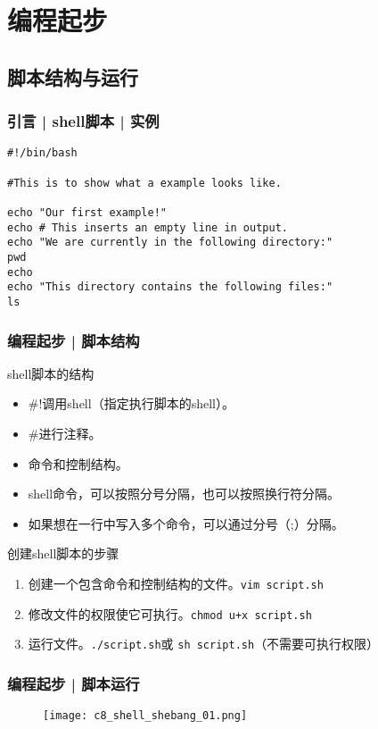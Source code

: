\section{编程起步}
\subsection{脚本结构与运行}
\begin{frame}[fragile]
  \frametitle{引言 | shell脚本 | 实例}
\begin{lstlisting}
#!/bin/bash

#This is to show what a example looks like.

echo "Our first example!"
echo # This inserts an empty line in output.
echo "We are currently in the following directory:"
pwd
echo
echo "This directory contains the following files:"
ls
\end{lstlisting}
\end{frame}

\begin{frame}[fragile]
  \frametitle{编程起步 | \alert{脚本结构}}
  \begin{block}{shell脚本的结构}
    \begin{itemize}
      \item \#!调用shell（指定执行脚本的shell）。
      \item \#进行注释。
      \item 命令和控制结构。
      \item shell命令，可以按照分号分隔，也可以按照换行符分隔。
      \item 如果想在一行中写入多个命令，可以通过分号（;）分隔。
    \end{itemize}
  \end{block}
  \pause
  \begin{block}{创建shell脚本的步骤}
    \begin{enumerate}
      \item 创建一个包含命令和控制结构的文件。\verb|vim script.sh|
      \item 修改文件的权限使它可执行。\verb|chmod u+x script.sh|
      \item 运行文件。\verb|./script.sh|或 \verb|sh script.sh|（不需要可执行权限）
    \end{enumerate}
  \end{block}
\end{frame}

\begin{frame}
  \frametitle{编程起步 | 脚本运行}
  \begin{figure}
    \centering
    \texttt{[image: c8\_shell\_shebang\_01.png]}
  \end{figure}
\end{frame}


